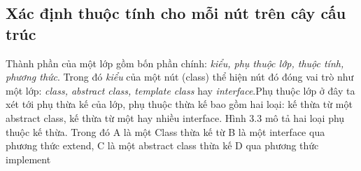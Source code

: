 \documentclass[12pt]{report}
\begin{document}
\subsection{Xác định thuộc tính cho mỗi nút trên cây cấu trúc}
Thành phần của một lớp gồm bốn phần chính: \textit{kiểu, phụ thuộc lớp, thuộc tính, phương thức}. Trong đó \textit{kiểu} của một nút (class) thể hiện nút đó đóng vai trò như một lớp:\textit{ class, abstract class, template class} hay \textit{interface}.Phụ thuộc lớp ở đây  ta xét tới phụ thừa kế của lớp, phụ thuộc thừa kế bao gồm hai loại: kế thừa từ một abstract class, kế thừa từ một hay nhiều interface. Hình 3.3 mô tả hai loại phụ thuộc kế thừa. Trong đó A là một Class thừa kế từ B là một interface qua phương thức extend, C là một abstract class thừa kế D qua phương thức implement

\begin{table}[h]
	\centering
	\tiny
	\caption{Thuộc tính trê mỗi nút}
	\label{tab:}
\end{table}
\newpage
\end{document}
